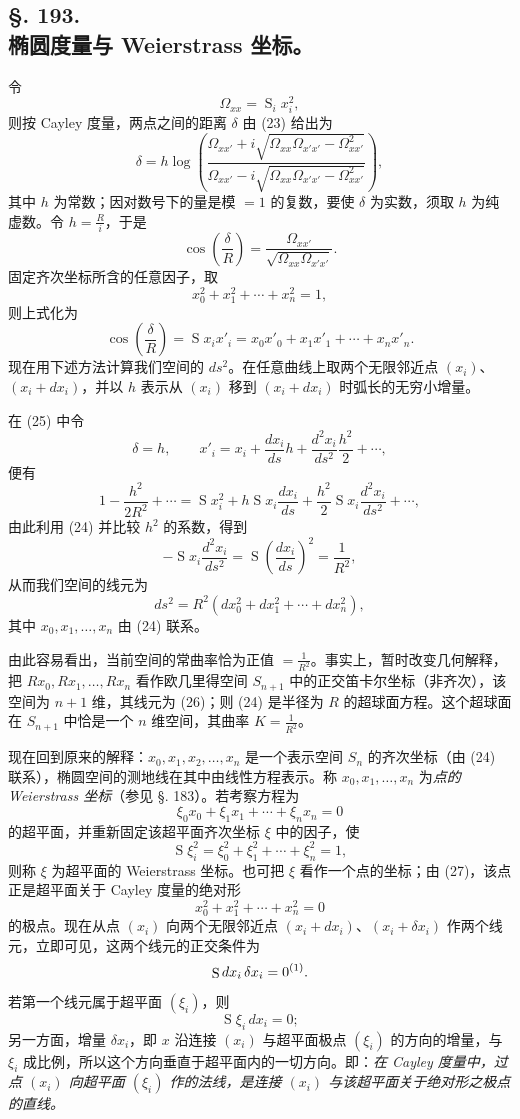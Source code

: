 \subsection*{§. 193.\\ 椭圆度量与 Weierstrass 坐标。}

令
\[
 \Omega_{xx}=\mathop{\mathrm{S}}_i x_i^2,
\]
则按 Cayley 度量，两点之间的距离 $\delta$ 由 (23) 给出为
\[
 \delta=h\log\left(\frac{\Omega_{xx'}+i\sqrt{\Omega_{xx}\Omega_{x'x'}-\Omega_{xx'}^2}}
 {\Omega_{xx'}-i\sqrt{\Omega_{xx}\Omega_{x'x'}-\Omega_{xx'}^2}}\right),
\]
其中 $h$ 为常数；因对数号下的量是模 $=1$ 的复数，要使 $\delta$ 为实数，须取 $h$ 为纯虚数。令 $h=\frac R i$，于是
\[
 \cos\left(\frac\delta R\right)=\frac{\Omega_{xx'}}{\sqrt{\Omega_{xx}\Omega_{x'x'}}}.
\]
固定齐次坐标所含的任意因子，取
\[
\tag{24}
 x_0^2+x_1^2+\cdots+x_n^2=1,
\]
则上式化为
\[
\tag{25}
 \cos\left(\frac\delta R\right)=\mathop{\mathrm{S}}x_i x'_i=x_0x'_0+x_1x'_1+\cdots+x_nx'_n.
\]
现在用下述方法计算我们空间的 $ds^2$。在任意曲线上取两个无限邻近点 $(x_i)$、$(x_i+dx_i)$，并以 $h$ 表示从 $(x_i)$ 移到 $(x_i+dx_i)$ 时弧长的无穷小增量。

在 (25) 中令
\[
 \delta=h,
 \qquad x'_i=x_i+\frac{dx_i}{ds}h+\frac{d^2x_i}{ds^2}\frac{h^2}{2}+\cdots,
\]
便有
\[
 1-\frac{h^2}{2R^2}+\cdots=\mathop{\mathrm{S}}x_i^2+h\mathop{\mathrm{S}}x_i\frac{dx_i}{ds}+\frac{h^2}{2}\mathop{\mathrm{S}}x_i\frac{d^2x_i}{ds^2}+\cdots,
\]
由此利用 (24) 并比较 $h^2$ 的系数，得到
\[
 -\mathop{\mathrm{S}}x_i\frac{d^2x_i}{ds^2}=\mathop{\mathrm{S}}\left(\frac{dx_i}{ds}\right)^2=\frac1{R^2},
\]
从而我们空间的线元为
\[
\tag{26}
 ds^2=R^2(dx_0^2+dx_1^2+\cdots+dx_n^2),
\]
其中 $x_0,x_1,\ldots,x_n$ 由 (24) 联系。

由此容易看出，当前空间的常曲率恰为正值 $=\frac1{R^2}$。事实上，暂时改变几何解释，把 $Rx_0,Rx_1,\ldots,Rx_n$ 看作欧几里得空间 $S_{n+1}$ 中的正交笛卡尔坐标（非齐次），该空间为 $n+1$ 维，其线元为 (26)；则 (24) 是半径为 $R$ 的超球面方程。这个超球面在 $S_{n+1}$ 中恰是一个 $n$ 维空间，其曲率 $K=\frac1{R^2}$。

现在回到原来的解释：$x_0,x_1,x_2,\ldots,x_n$ 是一个表示空间 $S_n$ 的齐次坐标（由 (24) 联系），椭圆空间的测地线在其中由线性方程表示。称 $x_0,x_1,\ldots,x_n$ 为\emph{点的 Weierstrass 坐标}（参见 §. 183）。若考察方程为
\[
\tag{27}
 \xi_0x_0+\xi_1x_1+\cdots+\xi_nx_n=0
\]
的超平面，并重新固定该超平面齐次坐标 $\xi$ 中的因子，使
\[
 \mathop{\mathrm{S}}\xi_i^2=\xi_0^2+\xi_1^2+\cdots+\xi_n^2=1,
\]
则称 $\xi$ 为超平面的 Weierstrass 坐标。也可把 $\xi$ 看作一个点的坐标；由 (27)，该点正是超平面关于 Cayley 度量的绝对形
\[
 x_0^2+x_1^2+\cdots+x_n^2=0
\]
的极点。现在从点 $(x_i)$ 向两个无限邻近点 $(x_i+dx_i)$、$(x_i+\delta x_i)$ 作两个线元，立即可见，这两个线元的正交条件为
\[
 \mathop{\mathrm{S}}dx_i\,\delta x_i=0\srcfnmark{1}.
\]
若第一个线元属于超平面 $(\xi_i)$，则
\[
 \mathop{\mathrm{S}}\xi_i\,dx_i=0;
\]
另一方面，增量 $\delta x_i$，即 $x$ 沿连接 $(x_i)$ 与超平面极点 $(\xi_i)$ 的方向的增量，与 $\xi_i$ 成比例，所以这个方向垂直于超平面内的一切方向。即：\emph{在 Cayley 度量中，过点 $(x_i)$ 向超平面 $(\xi_i)$ 作的法线，是连接 $(x_i)$ 与该超平面关于绝对形之极点的直线。}

